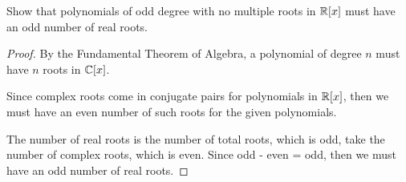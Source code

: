 \documentclass[../hw6]{subfiles}
\begin{document}
\begin{problem}
Show that polynomials of odd degree with no multiple roots in $\mathbb{R}[x]$
must have an odd number of real roots.
\end{problem}
\begin{proof}
	By the Fundamental Theorem of Algebra, a polynomial of degree $n$ must have $n$ roots in $\mathbb{C}[x]$.

	Since complex roots come in conjugate pairs for polynomials in $\mathbb{R}[x]$, then we must have an even number of such roots for the given polynomials.

	The number of real roots is the number of total roots, which is odd, take the number of complex  roots, which is even.
	Since odd - even = odd, then we must have an odd number of real roots.
\end{proof}
\end{document}
